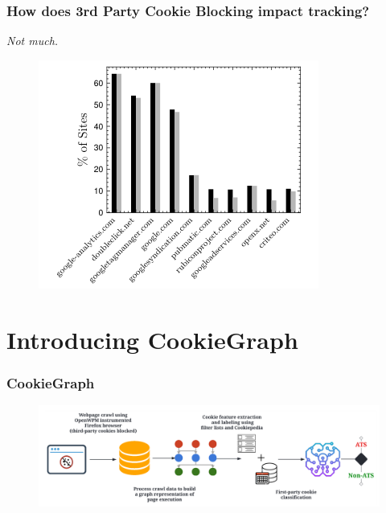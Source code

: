\documentclass{beamer}
\begin{document}
\begin{frame}
\frametitle{How does 3rd Party Cookie Blocking impact tracking?}
\centering
\textit{Not much.}

\end{frame}

\begin{frame}
\begin{figure}
\includegraphics[scale=0.5]{img/trackingwhen3rdpcblock}
\end{figure}
\end{frame}


\section{Introducing CookieGraph}

\begin{frame}
\frametitle{CookieGraph}

\begin{figure}
\includegraphics[scale=0.2]{img/diagram}
\end{figure}

\end{frame}
\end{document}
